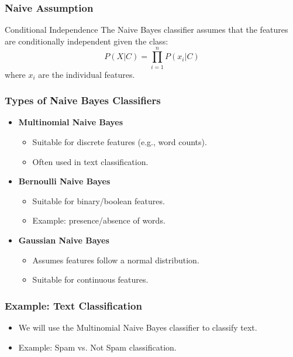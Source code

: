 \documentclass{beamer}
\begin{document}
\begin{frame}
    \frametitle{Naive Assumption}
    \begin{block}{Conditional Independence}
        The Naive Bayes classifier assumes that the features are conditionally independent given the class:
        \[
        P(X | C) = \prod_{i=1}^{n} P(x_i | C)
        \]
        where \( x_i \) are the individual features.
    \end{block}
\end{frame}

\begin{frame}
    \frametitle{Types of Naive Bayes Classifiers}
    \begin{itemize}
        \item \textbf{Multinomial Naive Bayes}
        \begin{itemize}
            \item Suitable for discrete features (e.g., word counts).
            \item Often used in text classification.
        \end{itemize}
        \item \textbf{Bernoulli Naive Bayes}
        \begin{itemize}
            \item Suitable for binary/boolean features.
            \item Example: presence/absence of words.
        \end{itemize}
        \item \textbf{Gaussian Naive Bayes}
        \begin{itemize}
            \item Assumes features follow a normal distribution.
            \item Suitable for continuous features.
        \end{itemize}
    \end{itemize}
\end{frame}

\begin{frame}
    \frametitle{Example: Text Classification}
    \begin{itemize}
        \item We will use the Multinomial Naive Bayes classifier to classify text.
        \item Example: Spam vs. Not Spam classification.
    \end{itemize}
\end{frame}
\end{document}
